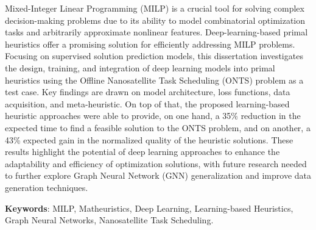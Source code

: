 
\setlength{\absparsep}{18pt} %

\begin{resumo}[Abstract]

\noindent

Mixed-Integer Linear Programming (MILP) is a crucial tool for solving complex decision-making problems due to its ability to model combinatorial optimization tasks and arbitrarily approximate nonlinear features.
Deep-learning-based primal heuristics offer a promising solution for efficiently addressing MILP problems.
Focusing on supervised solution prediction models, this dissertation investigates the design, training, and integration of deep learning models into primal heuristics using the Offline Nanosatellite Task Scheduling (ONTS) problem as a test case.
Key findings are drawn on model architecture, loss functions, data acquisition, and meta-heuristic.
On top of that, the proposed learning-based heuristic approaches were able to provide, on one hand, a 35\% reduction in the expected time to find a feasible solution to the ONTS problem, and on another, a 43\% expected gain in the normalized quality of the heuristic solutions.
These results highlight the potential of deep learning approaches to enhance the adaptability and efficiency of optimization solutions, with future research needed to further explore Graph Neural Network (GNN) generalization and improve data generation techniques.

\vspace{\onelineskip}

\noindent 

\textbf{Keywords}: MILP, Matheuristics, Deep Learning, Learning-based Heuristics, Graph Neural Networks, Nanosatellite Task Scheduling.

\end{resumo}



